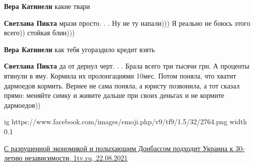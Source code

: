 \begin{itemize}
\begin{itemize}
 
\textbf{Вера Катинели} какие твари

 
\textbf{Светлана Пикта} мрази просто. . . Ну не ту напали))) Я реально не боюсь
этого всего)) стойкая блин)))

 
\textbf{Вера Катинели} как тебя угораздило кредит взять

 
\textbf{Светлана Пикта} да от дернул черт. . . Брала всего три тысячи грн. А
проценты втянули в яму. Кормила их пролонгациями 10мес. Потом поняла, что
хватит дармоедов кормить. Вернее не сама поняла, а юристу позвонила, а тот
сказал прямо: меняйте симку и живите дальше при своих деньгах и не кормите
дармоедов))
\end{itemize}

 
\ifcmt
  ig https://www.facebook.com/images/emoji.php/v9/tf9/1.5/32/2764.png
  width 0.1
\fi

\href{https://www.1tv.ru/n/411804}{%
С разрушенной экономикой и полыхающим Донбассом подходит Украина к 30-летию независимости, 1tv.ru, 22.08.2021%
}


\end{itemize}
